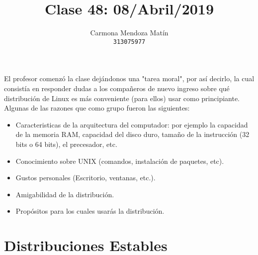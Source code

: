 \documentclass[11pt, a4paper]{report}
\begin{document}
\title{Clase 48: 08/Abril/2019}
\author{
  Carmona Mendoza Mat\'in\\
  \texttt{313075977}
}
\date{}
\maketitle
El profesor comenzó la clase dejándonos una "tarea moral", por así decirlo, la
cual consistía en responder dudas a los compañeros de nuevo ingreso sobre qué
distribución de Linux es más conveniente (para ellos) usar como principiante.
Algunas de las razones que como grupo fueron las siguientes: \\

\begin{itemize}
\item Caracteristicas de la arquitectura del computador: por ejemplo la
  capacidad de la memoria RAM, capacidad del disco duro, tamaño de la
  instrucción (32 bits o 64 bits), el precesador, etc.  
\item Conocimiento sobre UNIX (comandos, instalación de paquetes, etc).
\item Gustos personales (Escritorio, ventanas, etc.).
\item Amigabilidad de la distribución.
\item Propósitos para los cuales usarás la distribución.
\end{itemize}

\section*{Distribuciones Estables}
\end{document}
